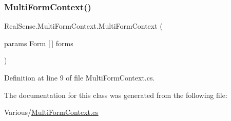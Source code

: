 \subsubsection{\texorpdfstring{Multi\+Form\+Context()}{MultiFormContext()}}
{\footnotesize\ttfamily Real\+Sense.\+Multi\+Form\+Context.\+Multi\+Form\+Context (\begin{DoxyParamCaption}\item[{params Form \mbox{[}$\,$\mbox{]}}]{forms }\end{DoxyParamCaption})}



Definition at line 9 of file Multi\+Form\+Context.\+cs.



The documentation for this class was generated from the following file\+:\begin{DoxyCompactItemize}
\item 
Various/\hyperlink{_multi_form_context_8cs}{Multi\+Form\+Context.\+cs}\end{DoxyCompactItemize}
